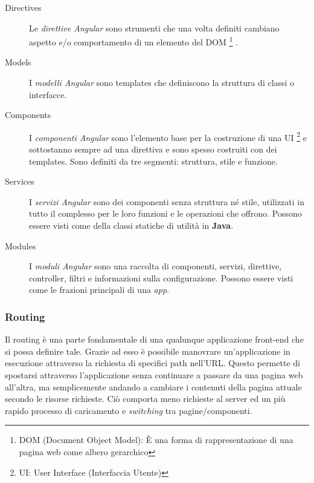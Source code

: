 \documentclass[twoside]{supsistudent}
\begin{document}
\begin{description}

  \item[Directives] Le \textit{direttive Angular} sono strumenti che una volta
  definiti cambiano aspetto e/o comportamento di un elemento del DOM
  \footnote{DOM (Document Object Model): È una forma di rappresentazione di
  una pagina web come albero gerarchico}
  . 

  \item[Models] I \textit{modelli Angular} sono templates che definiscono la
  struttura di classi o interfacce.

  \item[Components] I \textit{componenti Angular} sono l'elemento base per la
  costruzione di una UI
  \footnote{UI: User Interface (Interfaccia Utente)}
  e sottostanno sempre ad una direttiva e sono spesso costruiti con dei 
  templates. Sono definiti da tre segmenti: struttura, stile e funzione.  

  \item[Services] I \textit{servizi Angular} sono dei componenti senza 
  struttura né stile, utilizzati in tutto il complesso per le loro funzioni
  e le operazioni che offrono. Possono essere visti come della classi statiche
  di utilità in \textbf{Java}.

  \item[Modules] I \textit{moduli Angular} sono una raccolta di componenti, 
  servizi, direttive, controller, filtri e informazioni sulla configurazione.
  Possono essere visti come le frazioni principali di una \textit{app}.

\end{description}

\subsubsection{Routing}

Il routing è una parte fondamentale di una qualunque applicazione front-end
che si possa definire tale. Grazie ad esso è possibile manovrare 
un’applicazione in esecuzione attraverso la richiesta di specifici path
nell’URL. Questo permette di spostarsi attraverso l'applicazione senza 
continuare a passare da una pagina web all'altra, ma semplicemente andando a
cambiare i contenuti della pagina attuale secondo le risorse richieste. Ciò 
comporta meno richieste al server ed un più rapido processo di caricamento
e \textit{switching} tra pagine/componenti.
\end{document}
